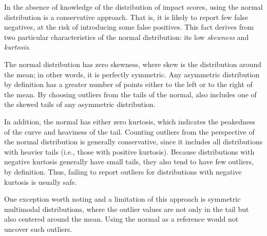 In the absence of knowledge of the distribution of impact scores, using
the normal distribution is a conservative approach. That is, it
is likely to report few false negatives, at the risk of introducing some false
positives. This fact derives from two particular characteristics of the
normal distribution: its low \emph{skewness} and \emph{kurtosis}.

The normal distribution has zero skewness, where skew is the
distribution around the mean; in other words, it is perfectly
symmetric. Any asymmetric distribution by definition has a greater
number of points either to the left or to the right of the mean. By
choosing outliers from the tails of the normal, \checkcell{} also
includes one of the skewed tails of any asymmetric distribution.

In addition, the normal has either zero kurtosis, which indicates the
peakedness of the curve and heaviness of the tail. Counting outliers
from the perspective of the normal distribution is generally
conservative, since it includes all distributions with heavier tails
(i.e., those with positive kurtosis). Because distributions with negative
kurtosis generally have small tails, they also tend to have few
outliers, by definition. Thus, failing to report outliers for
distributions with negative kurtosis is usually safe.

One exception worth noting and a limitation of this approach is
symmetric multimodal distributions, where the outlier values are not only
in the tail but also centered around the mean. Using the normal as a
reference would not uncover such outliers.

